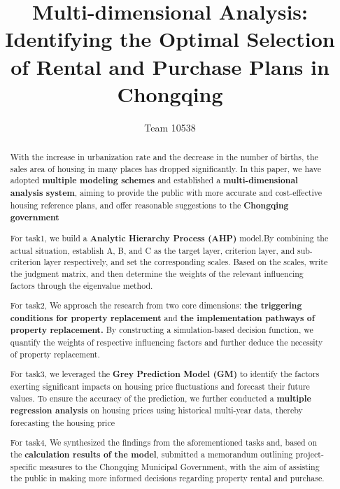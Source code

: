 \documentclass{mcmthesis}
\title{\textbf{Multi-dimensional Analysis: Identifying the Optimal Selection of Rental and Purchase Plans in Chongqing}}
\author{Team 10538} %
\begin{document}
\begin{abstract}
\begingroup
\setlength{\parskip}{8pt} %

With the increase in urbanization rate and the decrease in the number of births, the sales area of housing in many places has dropped significantly.
In this paper, we have adopted \textbf{multiple modeling schemes} and established a \textbf{multi-dimensional analysis system}, 
aiming to provide the public with more accurate and cost-effective housing reference plans, 
and offer reasonable suggestions to the \textbf{Chongqing government}

For task1, we build a \textbf{Analytic Hierarchy Process (AHP)} model.By combining the actual situation, 
establish A, B, and C as the target layer, criterion layer, and sub-criterion layer respectively, 
and set the corresponding scales. Based on the scales, write the judgment matrix,
and then determine the weights of the relevant influencing factors through the eigenvalue method.

For task2, We approach the research from two core dimensions: 
\textbf{the triggering conditions for property replacement} and \textbf{the implementation pathways of property replacement.}
By constructing a simulation-based decision function, 
we quantify the weights of respective influencing factors and further deduce the necessity of property replacement.

For task3, we leveraged the \textbf{Grey Prediction Model (GM)} 
to identify the factors exerting significant impacts on housing price fluctuations and forecast their future values. 
To ensure the accuracy of the prediction, we further conducted a \textbf{multiple regression analysis}
on housing prices using historical multi-year data, thereby forecasting the housing price

For task4, We synthesized the findings from the aforementioned tasks and, 
based on the \textbf{calculation results of the model}, 
submitted a memorandum outlining project-specific measures to the Chongqing Municipal Government, 
with the aim of assisting the public in making more informed decisions regarding property rental and purchase.

\endgroup
\end{abstract}
\end{document}
